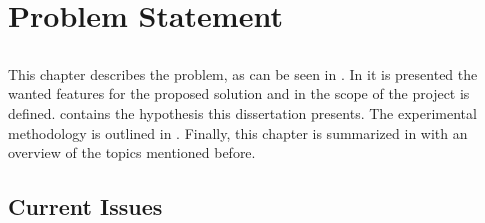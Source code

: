 \chapter{Problem Statement} \label{chap:problem_statement}

\section*{}

\minitoc \mtcskip \noindent
This chapter describes the problem, as can be seen in . In  it is presented the wanted features for the proposed solution and in  the scope of the project is defined.  contains the hypothesis this dissertation presents. The experimental methodology is outlined in . Finally, this chapter is summarized in  with an overview of the topics mentioned before.

\section{Current Issues}\label{sec:current_issues}


